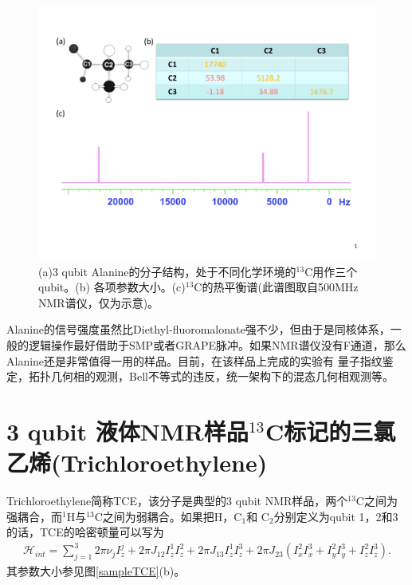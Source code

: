 \begin{figure}[htbp]
            \begin{center}
              \includegraphics[width= 0.8\columnwidth]{figures/samplealanine.pdf}
              \caption{(a)3 qubit Alanine的分子结构，处于不同化学环境的$^{13}$C用作三个qubit。(b) 各项参数大小。(c)$^{13}$C的热平衡谱(此谱图取自500MHz NMR谱仪，仅为示意)。}
              \label{samplealanine}
            \end{center}
\end{figure}

Alanine的信号强度虽然比Diethyl-fluoromalonate强不少，但由于是同核体系，一般的逻辑操作最好借助于SMP或者GRAPE脉冲。如果NMR谱仪没有F通道，那么Alanine还是非常值得一用的样品。目前，在该样品上完成的实验有
量子指纹鉴定\cite{app19}，拓扑几何相的观测\cite{app20}，Bell不等式的违反\cite{app21}，统一架构下的混态几何相观测\cite{app22}等。

\section{3 qubit 液体NMR样品$^{13}$C标记的三氯乙烯(Trichloroethylene)}

Trichloroethylene简称TCE，该分子是典型的3 qubit NMR样品，两个$^{13}$C之间为强耦合，而$^1$H与$^{13}$C之间为弱耦合。如果把H，C$_1$和 C$_2$分别定义为qubit 1，2和3的话，TCE的哈密顿量可以写为
\begin{eqnarray}
\mathcal{H}_{int}=\sum\limits_{j=1}^3 {2\pi \nu _j } I_z^j  + {2\pi} J_{12} I_z^1 I_z^2+{2\pi} J_{13} I_z^1 I_z^3+{2\pi} J_{23} (I_x^2 I_x^3+I_y^2 I_y^3+I_z^2 I_z^3).
\end{eqnarray}
其参数大小参见图\ref{sampleTCE}(b)。

